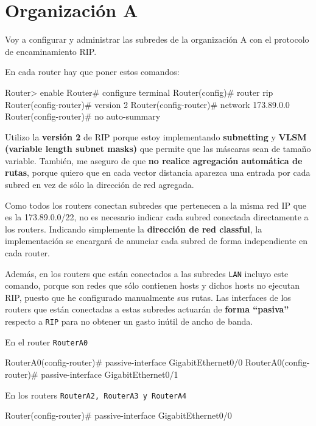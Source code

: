 
\section{Organización A}

\par Voy a configurar y administrar las subredes de la organización A con el protocolo de encaminamiento RIP.
\par En cada router hay que poner estos comandos:
\begin{listing}[style=consola]
Router> enable
Router# configure terminal
Router(config)# router rip
Router(config-router)# version 2
Router(config-router)# network 173.89.0.0
Router(config-router)# no auto-summary
\end{listing}
\par Utilizo la \textbf{versión 2} de RIP porque estoy implementando \textbf{subnetting} y \textbf{VLSM (variable length subnet masks)} que permite que las máscaras sean de tamaño variable. También, me aseguro de que \textbf{no realice agregación automática de rutas}, porque quiero que en cada vector distancia aparezca una entrada por cada subred en vez de sólo la dirección de red agregada.
\par Como todos los routers conectan subredes que pertenecen a la misma red IP que es la 173.89.0.0/22, no es necesario indicar cada subred conectada directamente a los routers. Indicando simplemente la \textbf{dirección de red classful}, la implementación se encargará de anunciar cada subred de forma independiente en cada router.
\par Además, en los routers que están conectados a las subredes \texttt{LAN} incluyo este comando, porque son redes que sólo contienen hosts y dichos hosts no ejecutan RIP, puesto que he configurado manualmente sus rutas. Las interfaces de los routers que están conectadas a estas subredes actuarán de \textbf{forma ``pasiva''} respecto a \texttt{RIP} para no obtener un gasto inútil de ancho de banda.
\par En el router \texttt{RouterA0} 
\begin{listing}[style=consola]
RouterA0(config-router)# passive-interface GigabitEthernet0/0
RouterA0(config-router)# passive-interface GigabitEthernet0/1
\end{listing}
\par En los routers \texttt{RouterA2, RouterA3 y RouterA4}
\begin{listing}[style=consola]
Router(config-router)# passive-interface GigabitEthernet0/0
\end{listing}






\newpage